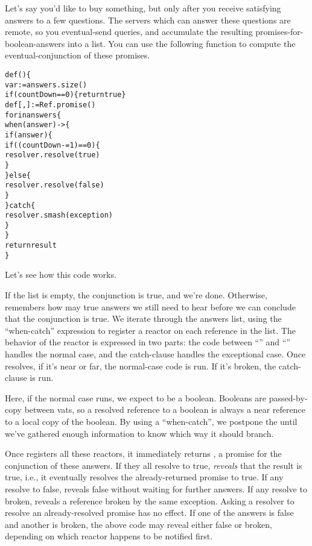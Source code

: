\documentclass{llncs}
\begin{document}
Let's say you'd like to buy something, but only after you receive
satisfying answers to a few questions. The servers which can answer
these questions are remote, so you eventual-send queries, and
accumulate the resulting promises-for-boolean-answers into a list. You
can use the following  function to compute the
eventual-conjunction of these promises.
%
\begin{alltt}
    def () \{
        var  := answers.size()
        if (countDown == 0) \{ return true \}
        def [, ] := Ref.promise()
        for  in answers \{
            when (answer) -> \{
                if (answer) \{
                    if ((countDown -= 1) == 0) \{
                        resolver.resolve(true) 
                    \}
                \} else \{
                    resolver.resolve(false)
                \}
            \} catch  \{
                resolver.smash(exception)
            \}
        \}
        return result
    \}
\end{alltt}
%
Let's see how this code works.

If the list is empty, the conjunction is true, and we're
done. Otherwise,  remembers how may true answers we
still need to hear before we can conclude that the conjunction is
true. We iterate through the answers list, using the ``when-catch''
expression to register a reactor on each reference in the list. The
behavior of the reactor is expressed in two parts: the code between
``\code{->~\{}'' and ``'' handles the normal case, and
the catch-clause handles the exceptional case. Once 
resolves, if it's near or far, the normal-case code is run. If it's
broken, the catch-clause is run.

Here, if the normal case runs, we expect  to be a
boolean. Booleans are passed-by-copy between vats, so a resolved
reference to a boolean is always a near reference to a local copy of
the boolean. By using a ``when-catch'', we postpone the 
until we've gathered enough information to know which way it should
branch.

Once  registers all these reactors, it immediately
returns , a promise for the conjunction of these
answers. If they all resolve to true,  \emph{reveals}
that the result is true, i.e., it eventually resolves the
already-returned promise to true. If any resolve to false,
 reveals false without waiting for further answers. If
any resolve to broken,  reveals a reference broken by
the same exception. Asking a resolver to resolve an already-resolved
promise has no effect. If one of the answers is false and another is
broken, the above  code may reveal either false or
broken, depending on which reactor happens to be notified first.
\end{document}
